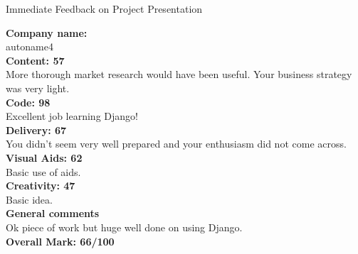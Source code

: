 \documentclass{article}
\begin{document}
\begin{center}
\Huge{Immediate Feedback on Project Presentation}\\
\end{center}


\normalsize
\textbf{Company name:}\\

autoname4 \\

\textbf{Content: 57}\\

More thorough market research would have been useful.
Your business strategy was very light.\\

\textbf{Code: 98}\\

Excellent job learning Django!\\

\textbf{Delivery: 67}\\

You didn't seem very well prepared and your enthusiasm did not come across.\\

\textbf{Visual Aids: 62}\\

Basic use of aids.\\

\textbf{Creativity: 47}\\

Basic idea.\\

\textbf{General comments}\\

Ok piece of work but huge well done on using Django.\\

\textbf{Overall Mark: 66/100}
\end{document}
